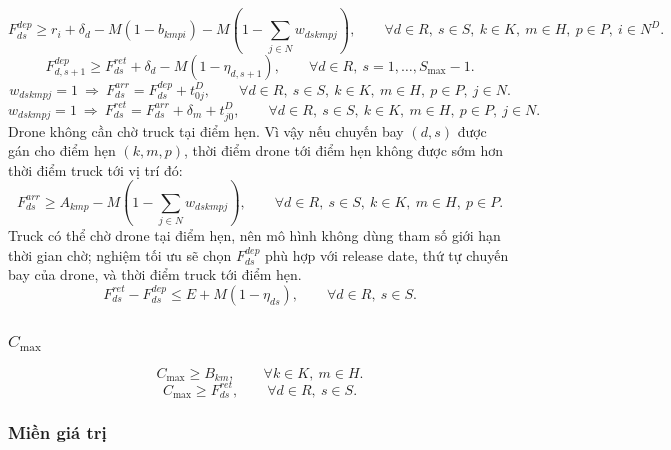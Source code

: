 \documentclass[12pt,a4paper]{article}
\begin{document}
\begin{equation}
  F^{dep}_{ds}\ge r_i+\delta_d -M\left(1-b_{kmpi}\right) -M\left(1-\sum_{j\in N}w_{dskmpj}\right), \qquad \forall d\in R,\ s\in S,\ k\in K,\ m\in H,\ p\in P,\ i\in N^D.
\end{equation}
\begin{equation}
  F^{dep}_{d,s+1}\ge F^{ret}_{ds}+\delta_d-M(1-\eta_{d,s+1}), \qquad \forall d\in R,\ s=1,\ldots,S_{\max}-1.
\end{equation}
\begin{equation}
  w_{dskmpj}=1\ \Longrightarrow\ F^{arr}_{ds}=F^{dep}_{ds}+t^D_{0j}, \qquad \forall d\in R,\ s\in S,\ k\in K,\ m\in H,\ p\in P,\ j\in N.
\end{equation}
\begin{equation}
  w_{dskmpj}=1\ \Longrightarrow\ F^{ret}_{ds}=F^{arr}_{ds}+\delta_m+t^D_{j0}, \qquad \forall d\in R,\ s\in S,\ k\in K,\ m\in H,\ p\in P,\ j\in N.
\end{equation}
Drone không cần chờ truck tại điểm hẹn. Vì vậy nếu chuyến bay $(d,s)$ được gán
cho điểm hẹn $(k,m,p)$, thời điểm drone tới điểm hẹn không được sớm hơn thời điểm
truck tới vị trí đó:
\begin{equation}
  F^{arr}_{ds}\ge A_{kmp}-M\left(1-\sum_{j\in N}w_{dskmpj}\right), \qquad \forall d\in R,\ s\in S,\ k\in K,\ m\in H,\ p\in P.
\end{equation}
Truck có thể chờ drone tại điểm hẹn, nên mô hình không dùng tham số giới hạn thời
gian chờ; nghiệm tối ưu sẽ chọn $F^{dep}_{ds}$ phù hợp với release date, thứ tự
chuyến bay của drone, và thời điểm truck tới điểm hẹn.
\begin{equation}
  F^{ret}_{ds}-F^{dep}_{ds}\le E+M(1-\eta_{ds}), \qquad \forall d\in R,\ s\in S.
\end{equation}

\subsubsection{$C_{\max}$}

\begin{equation}
  C_{\max}\ge B_{km}, \qquad \forall k\in K,\ m\in H.
\end{equation}
\begin{equation}
  C_{\max}\ge F^{ret}_{ds}, \qquad \forall d\in R,\ s\in S.
\end{equation}

\subsubsection{Miền giá trị}
\end{document}

